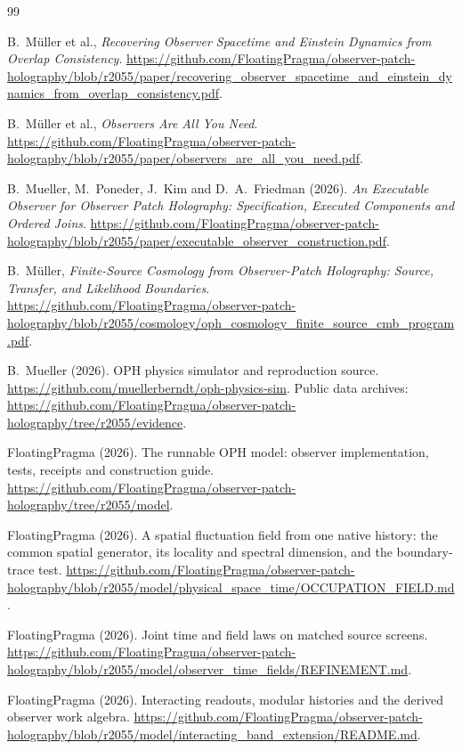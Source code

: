 \documentclass[11pt]{article}
\theoremstyle{remark}
\theoremstyle{plain}
\begin{document}
\begin{thebibliography}{99}

B.~M\"uller et al.,
\emph{Recovering Observer Spacetime and Einstein Dynamics from Overlap Consistency}.
\url{https://github.com/FloatingPragma/observer-patch-holography/blob/r2055/paper/recovering_observer_spacetime_and_einstein_dynamics_from_overlap_consistency.pdf}.

B.~M\"uller et al., \emph{Observers Are All You Need}.
\url{https://github.com/FloatingPragma/observer-patch-holography/blob/r2055/paper/observers_are_all_you_need.pdf}.

B.~Mueller, M.~Poneder, J.~Kim and D.~A.~Friedman (2026). \emph{An Executable Observer for
Observer Patch Holography: Specification, Executed Components and Ordered Joins}.
\url{https://github.com/FloatingPragma/observer-patch-holography/blob/r2055/paper/executable_observer_construction.pdf}.

B.~M\"uller, \emph{Finite-Source Cosmology from Observer-Patch Holography:
Source, Transfer, and Likelihood Boundaries}.
\url{https://github.com/FloatingPragma/observer-patch-holography/blob/r2055/cosmology/oph_cosmology_finite_source_cmb_program.pdf}.

B.~Mueller (2026). OPH physics simulator and reproduction source.
\url{https://github.com/muellerberndt/oph-physics-sim}. Public data archives:
\url{https://github.com/FloatingPragma/observer-patch-holography/tree/r2055/evidence}.

FloatingPragma (2026). The runnable OPH model: observer implementation,
tests, receipts and construction guide.
\url{https://github.com/FloatingPragma/observer-patch-holography/tree/r2055/model}.

FloatingPragma (2026). A spatial fluctuation field from one native history:
the common spatial generator, its locality and spectral dimension, and the
boundary-trace test.
\url{https://github.com/FloatingPragma/observer-patch-holography/blob/r2055/model/physical_space_time/OCCUPATION_FIELD.md}.

FloatingPragma (2026). Joint time and field laws on matched source screens.
\url{https://github.com/FloatingPragma/observer-patch-holography/blob/r2055/model/observer_time_fields/REFINEMENT.md}.

FloatingPragma (2026). Interacting readouts, modular histories and the
derived observer work algebra.
\url{https://github.com/FloatingPragma/observer-patch-holography/blob/r2055/model/interacting_band_extension/README.md}.


\end{thebibliography}
\end{document}
